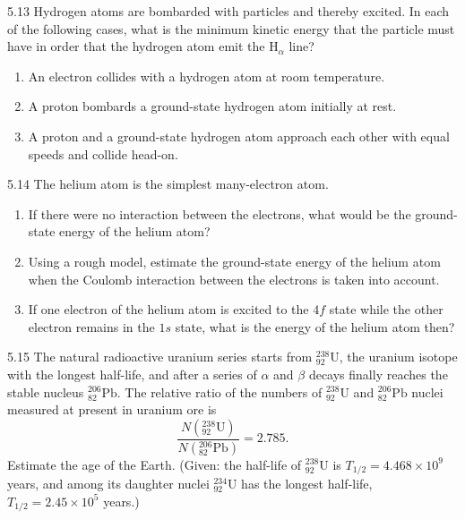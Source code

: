 \begin{problem}{5.13}
Hydrogen atoms are bombarded with particles and thereby excited. In each of the following cases, what is the minimum kinetic energy that the particle must have in order that the hydrogen atom emit the $\mathrm{H}_\alpha$ line?
\begin{enumerate}[label=(\arabic*),leftmargin=2.2em,itemsep=1pt,topsep=2pt]
\item An electron collides with a hydrogen atom at room temperature.
\item A proton bombards a ground-state hydrogen atom initially at rest.
\item A proton and a ground-state hydrogen atom approach each other with equal speeds and collide head-on.
\end{enumerate}
\end{problem}

\begin{problem}{5.14}
The helium atom is the simplest many-electron atom.
\begin{enumerate}[label=(\arabic*),leftmargin=2.2em,itemsep=1pt,topsep=2pt]
\item If there were no interaction between the electrons, what would be the ground-state energy of the helium atom?
\item Using a rough model, estimate the ground-state energy of the helium atom when the Coulomb interaction between the electrons is taken into account.
\item If one electron of the helium atom is excited to the $4f$ state while the other electron remains in the $1s$ state, what is the energy of the helium atom then?
\end{enumerate}
\end{problem}

\begin{problem}{5.15}
The natural radioactive uranium series starts from $^{238}_{92}\mathrm{U}$, the uranium isotope with the longest half-life, and after a series of $\alpha$ and $\beta$ decays finally reaches the stable nucleus $^{206}_{82}\mathrm{Pb}$. The relative ratio of the numbers of $^{238}_{92}\mathrm{U}$ and $^{206}_{82}\mathrm{Pb}$ nuclei measured at present in uranium ore is
\[
\frac{N(^{238}_{92}\mathrm{U})}{N(^{206}_{82}\mathrm{Pb})} = 2.785.
\]
Estimate the age of the Earth. (Given: the half-life of $^{238}_{92}\mathrm{U}$ is $T_{1/2} = 4.468\times10^9$ years, and among its daughter nuclei $^{234}_{92}\mathrm{U}$ has the longest half-life, $T_{1/2} = 2.45\times10^5$ years.)
\end{problem}


